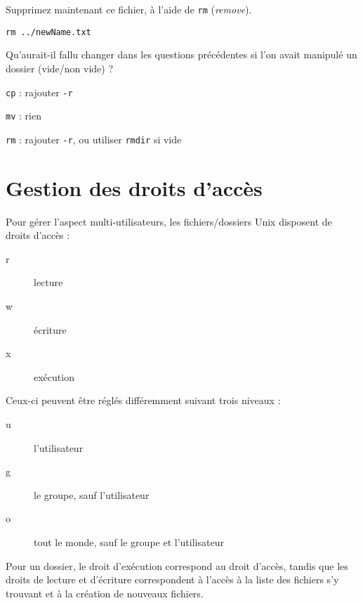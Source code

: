 \documentclass{scrartcl}
\begin{document}
\begin{question}[name=Q.]
	Supprimez maintenant ce fichier, à l'aide de \lstinline|rm| (\emph{remove}).
\end{question}
\begin{solution}
	\lstinline|rm ../newName.txt|
\end{solution}

\begin{question}[name=Q.]
	Qu'aurait-il fallu changer dans les questions précédentes si l'on avait manipulé un dossier (vide/non vide) ?
\end{question}
\begin{solution}
	\begin{description}
		\item \lstinline|cp| : rajouter \lstinline|-r|
		\item \lstinline|mv| : rien
		\item \lstinline|rm| : rajouter \lstinline|-r|, ou utiliser \lstinline|rmdir| si vide
	\end{description}
\end{solution}

\section{Gestion des droits d'accès}

Pour gérer l'aspect multi-utilisateurs, les fichiers/dossiers Unix disposent de droits d'accès :

\begin{description}
	\item[r] lecture
	\item[w] écriture
	\item[x] exécution
\end{description}

Ceux-ci peuvent être réglés différemment suivant trois niveaux :

\begin{description}
	\item[u] l'utilisateur
	\item[g] le groupe, sauf l'utilisateur
	\item[o] tout le monde, sauf le groupe et l'utilisateur
\end{description}

Pour un dossier, le droit d’exécution correspond au droit d'accès, tandis que les droits de lecture et d'écriture correspondent à l'accès à la liste des fichiers s'y trouvant et à la création de nouveaux fichiers.
\end{document}
